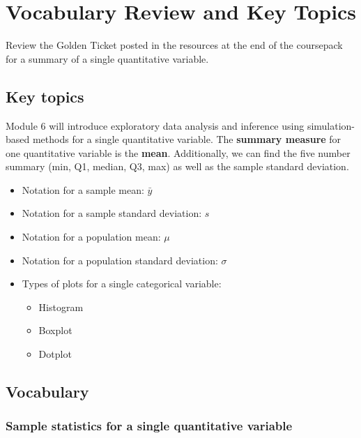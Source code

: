 \documentclass[
]{report}
\begin{document}
\section{Vocabulary Review and Key Topics}\label{vocabulary-review-and-key-topics-4}

Review the Golden Ticket posted in the resources at the end of the coursepack for a summary of a single quantitative variable.

\subsection{Key topics}\label{key-topics-5}

Module 6 will introduce exploratory data analysis and inference using simulation-based methods for a single quantitative variable.
The \textbf{summary measure} for one quantitative variable is the \textbf{mean}.
Additionally, we can find the five number summary (min, Q1, median, Q3, max) as well as the sample standard deviation.

\begin{itemize}
\item
  Notation for a sample mean: \(\bar{y}\)
\item
  Notation for a sample standard deviation: \(s\)
\item
  Notation for a population mean: \(\mu\)
\item
  Notation for a population standard deviation: \(\sigma\)
\item
  Types of plots for a single categorical variable:

  \begin{itemize}
  \item
    Histogram
  \item
    Boxplot
  \item
    Dotplot
  \end{itemize}
\end{itemize}

\subsection{Vocabulary}\label{vocabulary-4}

\subsubsection*{Sample statistics for a single quantitative variable}\label{sample-statistics-for-a-single-quantitative-variable}
\end{document}
